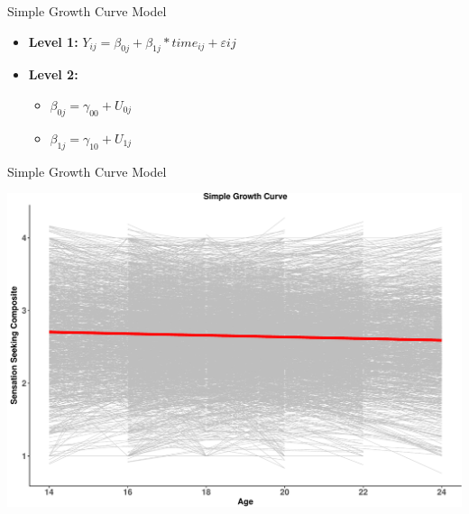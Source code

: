 \begin{frame}{Simple Growth Curve Model}

\begin{itemize}
  \item \textbf{Level 1:} $Y_{ij} = \beta_{0j} + \beta_{1j}*time_{ij} + \varepsilon{ij}$
  \item \textbf{Level 2:} 
    \begin{itemize} 
      \item $\beta_{0j} = \gamma_{00} + U_{0j}$
      \item $\beta_{1j} = \gamma_{10} + U_{1j}$
    \end{itemize}
\end{itemize}

\end{frame}

\begin{frame}{Simple Growth Curve Model}

\includegraphics{Conditional_Models_files/figure-beamer/unnamed-chunk-3-1.pdf}

\end{frame}

